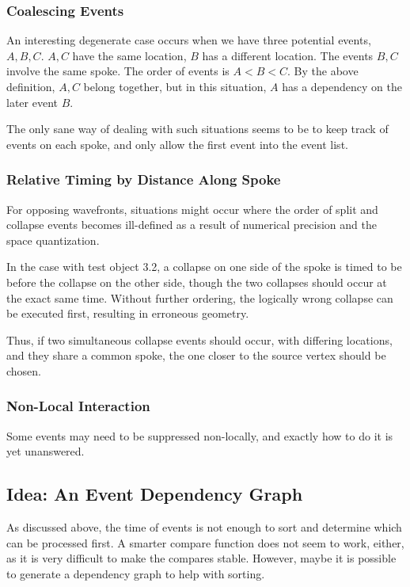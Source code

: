 \documentclass[12pt,a4paper,oneside,openany]{article}
\begin{document}
\subsubsection{Coalescing Events}

An interesting degenerate case occurs when we have three potential events, $A,B,C$. $A,C$ have the same location, $B$ has a different location. The events $B,C$ involve the same spoke. The order of events is $A < B < C$. By the above definition, $A,C$ belong together, but in this situation, $A$ has a dependency on the later event $B$.

The only sane way of dealing with such situations seems to be to keep track of events on each spoke, and only allow the first event into the event list.



\subsubsection{Relative Timing by Distance Along Spoke}

For opposing wavefronts, situations might occur where the order of split and collapse events becomes ill-defined as a result of numerical precision and the space quantization.

In the case with test object 3.2, a collapse on one side of the spoke is timed to be before the collapse on the other side, though the two collapses should occur at the exact same time. Without further ordering, the logically wrong collapse can be executed first, resulting in erroneous geometry.

Thus, if two simultaneous collapse events should occur, with differing locations, and they share a common spoke, the one closer to the source vertex should be chosen.

\subsubsection{Non-Local Interaction}

Some events may need to be suppressed non-locally, and exactly how to do it is yet unanswered.


\subsection{Idea: An Event Dependency Graph}

As discussed above, the time of events is not enough to sort and determine which can be processed first. A smarter compare function does not seem to work, either, as it is very difficult to make the compares stable. However, maybe it is possible to generate a dependency graph to help with sorting.
\end{document}
